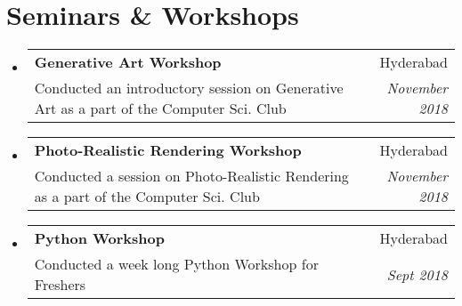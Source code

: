 \documentclass[a4paper,11pt]{article}
\makeatletter
\newcommand{\resumeSubheading}[4]{
    \item
        \begin{tabular*}{0.97\textwidth}{l@{\extracolsep{\fill}}r}
            \textbf{#1} & #2 \\
            \small#3 & \textit{\small #4} \\
        \end{tabular*}\vspace{-5pt}
}
\newcommand{\resumeSubHeadingListStart}{\begin{itemize}[leftmargin=*]}
\newcommand{\resumeSubHeadingListEnd}{\end{itemize}}
\makeatother
\begin{document}

\section{Seminars \& Workshops}
    \resumeSubHeadingListStart
        \resumeSubheading
            {Generative Art Workshop}{Hyderabad}
            {Conducted an introductory session on Generative Art as a part of the Computer Sci. Club}{November 2018}
        \resumeSubheading
            {Photo-Realistic Rendering Workshop}{Hyderabad}
            {Conducted a session on Photo-Realistic Rendering as a part of the Computer Sci. Club}{November 2018}
        \resumeSubheading
            {Python Workshop}{Hyderabad}
            {Conducted a week long Python Workshop for Freshers}{Sept 2018}
    \resumeSubHeadingListEnd
\end{document}
